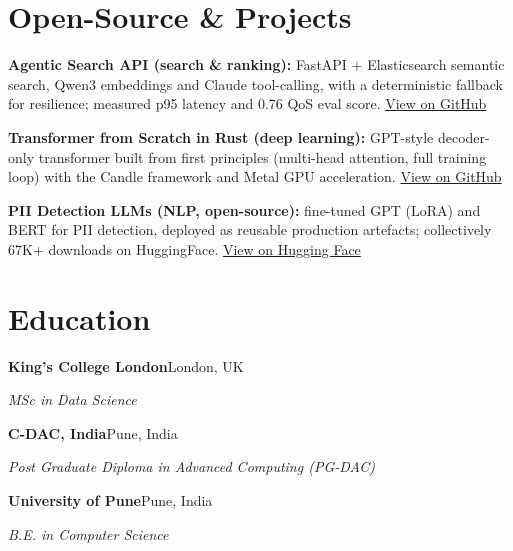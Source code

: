 \documentclass[10pt,a4paper]{article}
\begin{document}
\section{Open-Source \& Projects}
\begin{tight}
  \item \textbf{Agentic Search API (search \& ranking):} FastAPI + Elasticsearch semantic search, Qwen3 embeddings and Claude tool-calling, with a deterministic fallback for resilience; measured p95 latency and 0.76 QoS eval score. \href{https://github.com/abhijeetscode/search-agent}{View on GitHub}
  \item \textbf{Transformer from Scratch in Rust (deep learning):} GPT-style decoder-only transformer built from first principles (multi-head attention, full training loop) with the Candle framework and Metal GPU acceleration. \href{https://github.com/abhijeetscode/transformer-rust}{View on GitHub}
  \item \textbf{PII Detection LLMs (NLP, open-source):} fine-tuned GPT (LoRA) and BERT for PII detection, deployed as reusable production artefacts; collectively 67K+ downloads on HuggingFace. \href{https://huggingface.co/ab-ai/pii_model}{View on Hugging Face}
\end{tight}

\section{Education}
{\color{company}\bfseries King's College London}\hfill {\color{muted}London, UK}\par
{\itshape MSc in Data Science}\par\vspace{2pt}
{\color{company}\bfseries C-DAC, India}\hfill {\color{muted}Pune, India}\par
{\itshape Post Graduate Diploma in Advanced Computing (PG-DAC)}\par\vspace{2pt}
{\color{company}\bfseries University of Pune}\hfill {\color{muted}Pune, India}\par
{\itshape B.E. in Computer Science}\par
\end{document}
